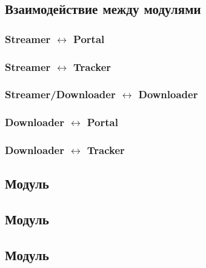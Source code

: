 

\subsection{Взаимодействие между модулями}

	\subsubsection{Streamer $\leftrightarrow$ Portal}

	\subsubsection{Streamer $\leftrightarrow$ Tracker}

	\subsubsection{Streamer/Downloader $\leftrightarrow$ Downloader}

	\subsubsection{Downloader $\leftrightarrow$ Portal}

	\subsubsection{Downloader $\leftrightarrow$ Tracker}

\subsection{Модуль }
\subsection{Модуль }
\subsection{Модуль }
